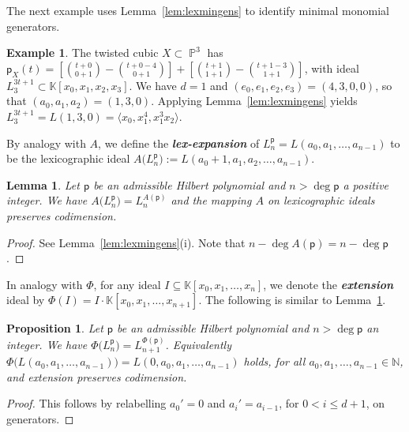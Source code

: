 \documentclass[12pt]{amsart}%
\newtheorem{lemma}[theorem]{Lemma}
\newtheorem{proposition}[theorem]{Proposition}
\theoremstyle{definition}%
\newtheorem{example}[theorem]{Example}
\DeclareMathOperator{\PP}{\mathbb{P}}%
\newcommand{\hp}{\mathsf{p}}%
\newcommand{\lift}{\Phi}%
\newcommand{\plus}{A}%
\newcommand{\kk}{\mathbb{K}}%
\newcommand{\NN}{\mathbb{N}}%
\begin{document}
The next example uses Lemma~\ref{lem:lexmingens} to identify minimal
monomial generators.

\begin{example}%
  \label{eg:twistedlexmingens} 
  The twisted cubic $X \subset \PP^3$ has $\hp_X(t) = \left[ \binom{t
      + 0}{0 + 1} - \binom{t + 0 - 4}{0 + 1} \right] + \left[ \binom{t
      + 1}{1 + 1} - \binom{t + 1 - 3}{1 + 1} \right]$, with ideal
  $L^{3t + 1}_3 \subset \kk[x_0, x_1, x_2, x_3]$.  We have $d = 1$ and
  $(e_0, e_1, e_2, e_3) = (4, 3, 0, 0)$, so that $(a_0, a_1, a_2) =
  (1, 3, 0)$.  Applying Lemma~\ref{lem:lexmingens} yields $L^{3t +
    1}_3 = L(1, 3, 0) = \langle x_0, x_1^4, x_1^3 x_2 \rangle$.
\end{example}

By analogy with $\plus$, we define the \emph{\bfseries lex-expansion}
of $L^{\hp}_n = L(a_0, a_1, \dotsc, a_{n-1})$ to be the lexicographic
ideal $\plus \bigl( L^{\hp}_n \bigr) := L(a_0 + 1, a_1, a_2, \dotsc,
a_{n-1})$.

\begin{lemma} 
  \label{lem:lexexpansion}
  Let $\hp$ be an admissible Hilbert polynomial and $n > \deg \hp$ a
  positive integer.  We have $\plus \bigl( L^{\hp}_n \bigr) = L^{\plus
    (\hp)}_n$ and the mapping $\plus$ on lexicographic ideals
  preserves codimension.
\end{lemma}

\begin{proof}
  See Lemma~\ref{lem:lexmingens}(i).  Note that $n - \deg \plus (\hp)
  = n - \deg \hp$.
\end{proof}

In analogy with $\lift$, for any ideal $I \subseteq \kk[x_0, x_1,
  \dotsc, x_n]$, we denote the \emph{\bfseries extension} ideal by
$\lift ( I ) = I \cdot \kk[x_0, x_1, \dotsc, x_{n+1}]$.  The following
is similar to Lemma~\ref{lem:lexexpansion}.

\begin{proposition} 
  \label{prop:lexextension}
  Let $\hp$ be an admissible Hilbert polynomial and $n > \deg \hp$ an
  integer.  We have $\lift \bigl( L^{\hp}_n \bigr) = L^{\lift
    (\hp)}_{n+1}$.  Equivalently $\lift \bigl( L(a_0, a_1, \dotsc,
  a_{n-1}) \bigr) = L(0, a_0, a_1, \dotsc, a_{n-1})$ holds, for all
  $a_0, a_1, \dotsc, a_{n-1} \in \NN$, and extension preserves
  codimension.
\end{proposition}

\begin{proof}
  This follows by relabelling $a_{0}' = 0$ and $a_{i}' = a_{i-1}$, for
  $0 < i \le d+1$, on generators.
\end{proof}
\end{document}
